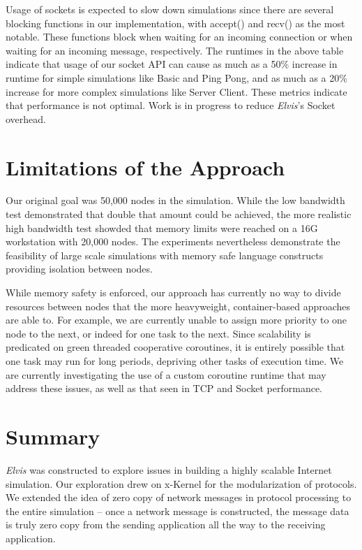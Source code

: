 \documentclass[journal]{IEEEtran} %
\newcommand{\elvis}{\textit{Elvis}}
\begin{document}
Usage of sockets is expected to slow down simulations since there are several blocking functions in our implementation, with accept() and recv() as the most notable. These functions block when waiting for an incoming connection or when waiting for an incoming message, respectively. The runtimes in the above table indicate that usage of our socket API can cause as much as a 50\% increase in runtime for simple simulations like Basic and Ping Pong, and as much as a 20\% increase for more complex simulations like Server Client. These metrics indicate that performance is not optimal. Work is in progress to reduce \elvis{}'s Socket overhead.

\section{Limitations of the Approach}
Our original goal was 50,000 nodes in the simulation. While the low bandwidth test demonstrated
that double that amount could be achieved, the more realistic high bandwidth test
showded that memory limits were reached on a 16G workstation with 20,000 nodes.
The experiments nevertheless demonstrate the feasibility of large scale simulations
with memory safe language constructs providing isolation between nodes.

While memory safety is enforced, our approach has currently no way to divide resources
between nodes that the more heavyweight, container-based approaches are able to.
For example, we are currently unable to assign more priority to
one node to the next, or indeed for one task to the next.
Since scalability is predicated on green threaded cooperative coroutines,
it is entirely possible that one task may run for long periods, depriving other
tasks of execution time. We are currently investigating the use of
a custom coroutine runtime that may address these issues, as well as
that seen in TCP and Socket performance.

\section{Summary}
\elvis{} was constructed to explore issues in building a highly scalable Internet simulation. Our exploration drew on x-Kernel\cite{xk} for the modularization of protocols. We extended the idea of zero copy of network messages in protocol processing to the entire simulation – once a network message is constructed, the message data is truly zero copy from the sending application all the way to the receiving application.
\end{document}
